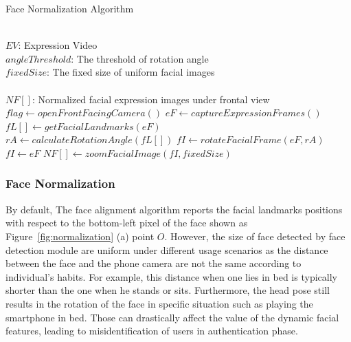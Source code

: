         \begin{algorithm}[!t]
            \centering
            \caption{Face Normalization Algorithm}
            \small
            \label{alg:normalization}
            \begin{algorithmic}[1]
                \REQUIRE~~\\
                    $EV$: Expression Video  \\
                    $angleThreshold$: The threshold of rotation angle\\
                    $fixedSize$: The fixed size of uniform facial images\\
                \ENSURE~~\\
                    $NF[]$: Normalized facial expression images under frontal view\\
                \STATE $flag \leftarrow openFrontFacingCamera()$
                    \STATE $eF \leftarrow captureExpressionFrames()$ \\
                        \STATE $fL[] \leftarrow getFacialLandmarks(eF)$ \\
                        \STATE $rA \leftarrow calculateRotationAngle(fL[])$
                            \STATE $fI \leftarrow rotateFacialFrame(eF,rA)$
                        \ELSE
                            \STATE $fI \leftarrow eF$
                        \ENDIF
                        \STATE $NF[] \leftarrow zoomFacialImage(fI,fixedSize)$
                    \ENDIF
                \ENDWHILE
            \end{algorithmic}
        \end{algorithm}
        \subsubsection{Face Normalization}
            By default, The face alignment algorithm reports the facial landmarks positions with respect to the bottom-left pixel of the face shown as Figure~\ref{fig:normalization} (a) point $O$. However, the size of face detected by face detection module are uniform under different usage scenarios as the distance between the face and the phone camera are not the same according to individual's habits. For example, this distance when one lies in bed is typically shorter than the one when he stands or sits. Furthermore, the head pose still results in the rotation of the face in specific situation such as playing the smartphone in bed. Those can drastically affect the value of the dynamic facial features, leading to misidentification of users in authentication phase.

